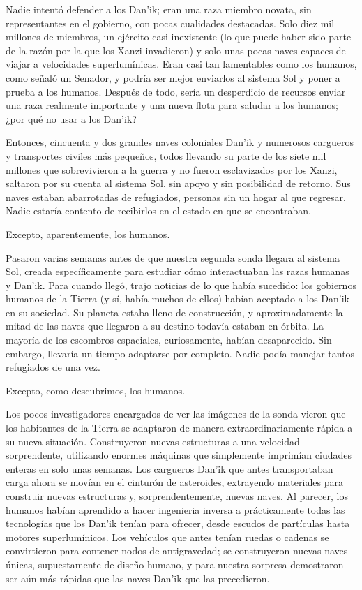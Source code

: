\documentclass[spanish,12pt,a4paper, oneside]{book}
\begin{document}
    Nadie intentó defender a los Dan'ik; eran una raza miembro novata, sin representantes en el gobierno, con pocas cualidades destacadas. Solo diez mil millones de miembros, un ejército casi inexistente (lo que puede haber sido parte de la razón por la que los Xanzi invadieron) y solo unas pocas naves capaces de viajar a velocidades superlumínicas. Eran casi tan lamentables como los humanos, como señaló un Senador, y podría ser mejor enviarlos al sistema Sol y poner a prueba a los humanos. Después de todo, sería un desperdicio de recursos enviar una raza realmente importante y una nueva flota para saludar a los humanos; ¿por qué no usar a los Dan'ik?

    Entonces, cincuenta y dos grandes naves coloniales Dan'ik y numerosos cargueros y transportes civiles más pequeños, todos llevando su parte de los siete mil millones que sobrevivieron a la guerra y no fueron esclavizados por los Xanzi, saltaron por su cuenta al sistema Sol, sin apoyo y sin posibilidad de retorno. Sus naves estaban abarrotadas de refugiados, personas sin un hogar al que regresar. Nadie estaría contento de recibirlos en el estado en que se encontraban.

    Excepto, aparentemente, los humanos.

    Pasaron varias semanas antes de que nuestra segunda sonda llegara al sistema Sol, creada específicamente para estudiar cómo interactuaban las razas humanas y Dan'ik. Para cuando llegó, trajo noticias de lo que había sucedido: los gobiernos humanos de la Tierra (y sí, había muchos de ellos) habían aceptado a los Dan'ik en su sociedad. Su planeta estaba lleno de construcción, y aproximadamente la mitad de las naves que llegaron a su destino todavía estaban en órbita. La mayoría de los escombros espaciales, curiosamente, habían desaparecido. Sin embargo, llevaría un tiempo adaptarse por completo. Nadie podía manejar tantos refugiados de una vez.

    Excepto, como descubrimos, los humanos.

    Los pocos investigadores encargados de ver las imágenes de la sonda vieron que los habitantes de la Tierra se adaptaron de manera extraordinariamente rápida a su nueva situación. Construyeron nuevas estructuras a una velocidad sorprendente, utilizando enormes máquinas que simplemente imprimían ciudades enteras en solo unas semanas. Los cargueros Dan'ik que antes transportaban carga ahora se movían en el cinturón de asteroides, extrayendo materiales para construir nuevas estructuras y, sorprendentemente, nuevas naves. Al parecer, los humanos habían aprendido a hacer ingenieria inversa a prácticamente todas las tecnologías que los Dan'ik tenían para ofrecer, desde escudos de partículas hasta motores superlumínicos. Los vehículos que antes tenían ruedas o cadenas se convirtieron para contener nodos de antigravedad; se construyeron nuevas naves únicas, supuestamente de diseño humano, y para nuestra sorpresa demostraron ser aún más rápidas que las naves Dan'ik que las precedieron.
\end{document}
